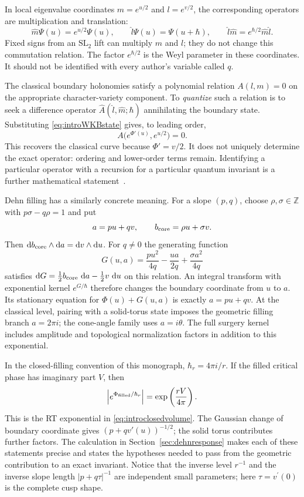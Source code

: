 \documentclass[11pt,a4paper]{article}
\numberwithin{equation}{section}
\theoremstyle{definition}
\theoremstyle{remark}
\newcommand{\dd}{\mathop{}\!\mathrm d}
\newcommand{\ZZ}{\mathbb Z}
\begin{document}
In local eigenvalue coordinates $m=e^{u/2}$ and $l=e^{v/2}$,
the corresponding operators are multiplication and translation:
\[
 \widehat m\Psi(u)=e^{u/2}\Psi(u),\qquad
 \widehat l\Psi(u)=\Psi(u+\hbar),\qquad
 \widehat l\widehat m=e^{\hbar/2}\widehat m\widehat l.
\]
Fixed signs from an $\mathrm{SL}_2$ lift can multiply $m$ and $l$;
they do not change this commutation relation. The factor
$e^{\hbar/2}$ is the Weyl parameter in these coordinates. It should
not be identified with every author's variable called $q$.

The classical boundary holonomies satisfy a polynomial relation
$A(l,m)=0$ on the appropriate character-variety component. To
\emph{quantize} such a relation is to seek a difference operator
$\widehat A(\widehat l,\widehat m;\hbar)$ annihilating the boundary
state. Substituting \eqref{eq:introWKBstate} gives, to leading order,
\[
 A\bigl(e^{\Phi'(u)},e^{u/2}\bigr)=0.
\]
This recovers the classical curve because $\Phi'=v/2$. It does not
uniquely determine the exact operator: ordering and lower-order
terms remain. Identifying a particular operator with a recursion
for a particular quantum invariant is a further mathematical
statement~\cite{GukovApoly,DimofteQuantumRS}.

Dehn filling has a similarly concrete meaning. For a slope $(p,q)$,
choose $\rho,\sigma\in\ZZ$ with $p\sigma-q\rho=1$ and put
\[
 a=pu+qv,\qquad b_{\rm core}=\rho u+\sigma v.
\]
Then $\dd b_{\rm core}\wedge\dd a=\dd v\wedge\dd u$. For $q\ne0$
the generating function
\begin{equation}
 G(u,a)=\frac{pu^2}{4q}-\frac{ua}{2q}
                    +\frac{\sigma a^2}{4q}
 \label{eq:introfillingkernel}
\end{equation}
satisfies $\dd G=\frac12b_{\rm core}\,\dd a-\frac12v\,\dd u$ on
this relation. An integral transform with exponential kernel
$e^{G/\hbar}$ therefore changes the boundary coordinate from $u$
to $a$. Its stationary equation for $\Phi(u)+G(u,a)$ is exactly
$a=pu+qv$. At the classical level, pairing with a solid-torus state imposes
the geometric filling branch $a=2\pi i$; the cone-angle family
uses $a=i\theta$.
The full surgery kernel includes amplitude and topological
normalization factors in addition to this exponential.

In the closed-filling convention of this monograph,
$\hbar_r=4\pi i/r$. If the filled critical phase has imaginary
part $V$, then
\begin{equation}
 \left|e^{\Phi_{\rm filled}/\hbar_r}\right|
       =\exp\left(\frac{rV}{4\pi}\right).
 \label{eq:introRTgrowth}
\end{equation}
This is the RT exponential in \eqref{eq:introclosedvolume}.
The Gaussian change of boundary coordinate gives
$(p+qv'(u))^{-1/2}$; the solid torus contributes further factors.
The calculation in Section~\ref{sec:dehnresponse} makes each of
these statements precise and states the hypotheses needed to pass
from the geometric contribution to an exact invariant. Notice that
the inverse level $r^{-1}$ and the inverse slope length
$|p+q\tau|^{-1}$ are independent small parameters; here
$\tau=v^\prime(0)$ is the complete cusp shape.
\end{document}
